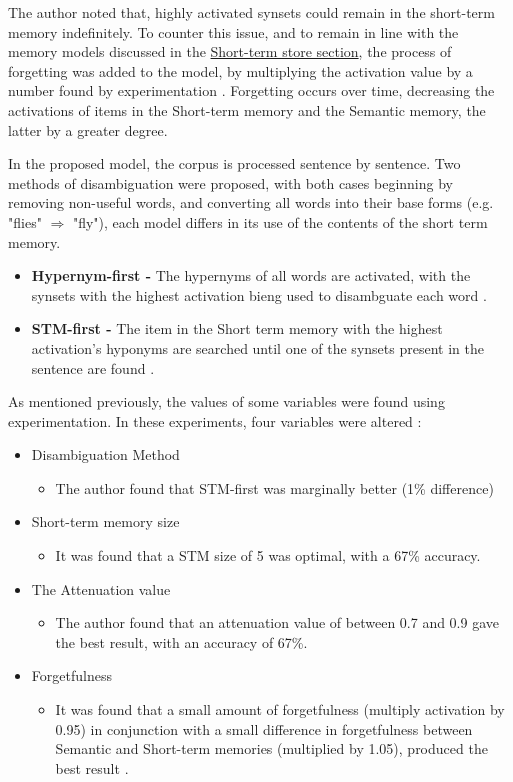 \documentclass[]{article}
\begin{document}
The author noted that, highly activated synsets could remain in the short-term memory indefinitely. To counter this issue, and to remain in line with the memory models discussed in the \hyperref[ShortTerm]{Short-term store section}, the process of forgetting was added to the model, by multiplying the activation value by a number found by experimentation \cite{MattBurkePrevious}. Forgetting occurs over time, decreasing the activations of items in the Short-term memory and the Semantic memory, the latter by a greater degree.

In the proposed model, the corpus is processed sentence by sentence. Two methods of disambiguation were proposed, with both cases beginning by removing non-useful words, and converting all words into their base forms (e.g. "flies" $\Rightarrow$ "fly"), each model differs in its use of the contents of the short term memory.
\begin{itemize}
	\item[] \textbf{Hypernym-first - } The hypernyms of all words are activated, with the synsets with the highest activation bieng used to disambguate each word \cite{MattBurkePrevious}.
	\item[] \textbf{STM-first - } The item in the Short term memory with the highest activation's hyponyms are searched until one of the synsets present in the sentence are found \cite{MattBurkePrevious}.
\end{itemize}


As mentioned previously, the values of some variables were found using experimentation. In these experiments, four variables were altered \cite{MattBurkePrevious}:
\begin{itemize}
	\item Disambiguation Method
	\begin{itemize}
		\item[] The author found that STM-first was marginally better (1\% difference)
	\end{itemize}
	\item Short-term memory size
	\begin{itemize}
		\item[] It was found that a STM size of 5 was optimal, with a 67\% accuracy.
	\end{itemize}
	\item The Attenuation value
	\begin{itemize}
		\item[] The author found that an attenuation value of between 0.7 and 0.9 gave the best result, with an accuracy of 67\%.
	\end{itemize}
	\item Forgetfulness
	\begin{itemize}
		\item[] It was found that a small amount of forgetfulness (multiply activation by 0.95) in conjunction with a small difference in forgetfulness between Semantic and Short-term memories (multiplied by 1.05), produced the best result \cite{MattBurkePrevious}.
	\end{itemize}
\end{itemize}
\end{document}
